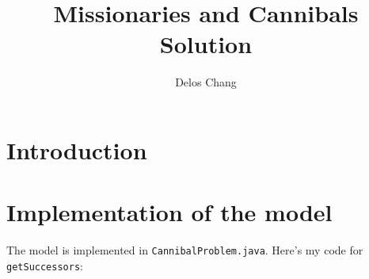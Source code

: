\documentclass[a4paper]{report}
\title{Missionaries and Cannibals Solution}
\author{Delos Chang}
\begin{document}
\maketitle

\section{Introduction}

\section{Implementation of the model}
The model is implemented in 
\verb`CannibalProblem.java`.  Here's my code for \verb`getSuccessors`:
\end{document}
